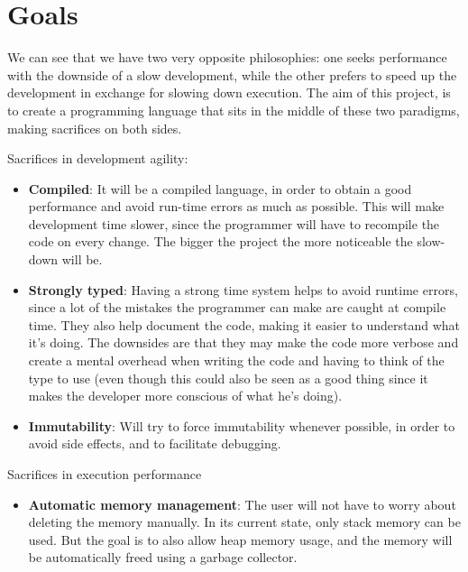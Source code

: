 ﻿\documentclass[10pt,a4paper,twocolumn,twoside]{article}
\begin{document}


\section{Goals}

We can see that we have two very opposite philosophies: one seeks performance
with the downside of a slow development, while the other prefers to speed up the
development in exchange for slowing down execution. The aim of this project, is
to create a programming language that sits in the middle of these two paradigms,
making sacrifices on both sides.

Sacrifices in development agility:
\begin{itemize}
     \item \textbf{Compiled}: It will be a compiled language, in order to obtain a
         good performance and avoid run-time errors as much as possible. This 
         will make development time slower, since the programmer will have to
         recompile the code on every change. The bigger the project the more 
         noticeable the slow-down will be.
     \item \textbf{Strongly typed}: Having a strong time system helps to avoid
         runtime errors, since a lot of the mistakes the programmer can make are
         caught at compile time. They also help document the code, making it 
         easier to understand what it's doing. The downsides are that they may 
         make the code more verbose and create a mental overhead when writing 
         the code and having to think of the type to use (even though this could
         also be seen as a good thing since it makes the developer more
         conscious of what he's doing).
     \item \textbf{Immutability}: Will try to force immutability whenever
         possible, in order to avoid side effects, and to facilitate debugging.
\end{itemize}

Sacrifices in execution performance
\begin{itemize}
     \item \textbf{Automatic memory management}: The user will not have to worry
         about deleting the memory manually. In its current state, only stack 
         memory can be used. But the goal is to also allow heap memory usage,
         and the memory will be automatically freed using a garbage collector.
\end{itemize}
\end{document}
